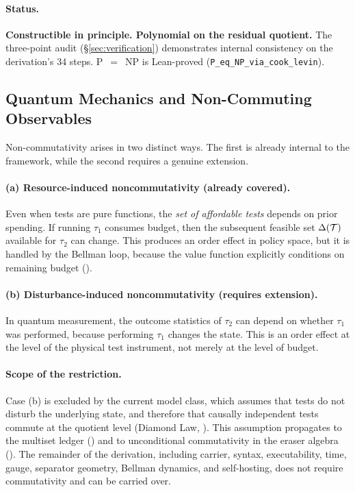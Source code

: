 \paragraph{Status.}
\textbf{Constructible in principle.  Polynomial on the residual quotient.}
The three-point audit (\S\ref{sec:verification}) demonstrates internal
consistency on the derivation's 34 steps.  P~$=$~NP is Lean-proved
(\texttt{P\_eq\_NP\_via\_cook\_levin}).

\subsection{Quantum Mechanics and Non-Commuting Observables}
\label{app:oq:quantum}

Non-commutativity arises in two distinct ways.  The first is already
internal to the framework, while the second requires a genuine extension.

\paragraph{(a) Resource-induced noncommutativity (already covered).}
Even when tests are pure functions, the \emph{set of affordable tests}
depends on prior spending.  If running $\tau_1$ consumes budget, then the
subsequent feasible set $\Delta(\mathcal{T})$ available for $\tau_2$ can change.
This produces an order effect in policy space, but it is handled by the
Bellman loop, because the value function explicitly conditions on remaining
budget ().

\paragraph{(b) Disturbance-induced noncommutativity (requires extension).}
In quantum measurement, the outcome statistics of $\tau_2$ can depend on
whether $\tau_1$ was performed, because performing $\tau_1$ changes the
state.  This is an order effect at the level of the physical test
instrument, not merely at the level of budget.

\paragraph{Scope of the restriction.}
Case (b) is excluded by the current model class, which assumes that tests
do not disturb the underlying state, and therefore that causally
independent tests commute at the quotient level (Diamond Law, ).
This assumption propagates to the multiset ledger () and to
unconditional commutativity in the eraser algebra ().  The
remainder of the derivation, including carrier, syntax, executability,
time, gauge, separator geometry, Bellman dynamics, and self-hosting, does
not require commutativity and can be carried over.

